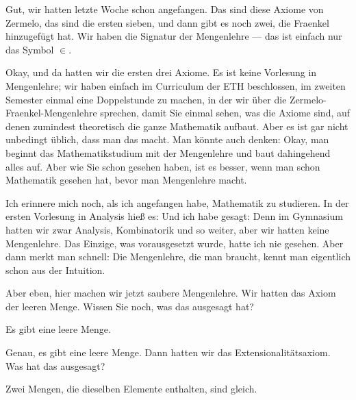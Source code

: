\begin{spoken-clean}[00:10:05 - 00:12:15]
Gut, wir hatten letzte Woche schon angefangen. Das sind diese Axiome von Zermelo, das sind die ersten sieben, und dann gibt es noch zwei, die Fraenkel hinzugefügt hat. Wir haben die Signatur der Mengenlehre --- das ist einfach nur das Symbol $\in$.

Okay, und da hatten wir die ersten drei Axiome. Es ist keine Vorlesung in Mengenlehre; wir haben einfach im Curriculum der ETH beschlossen, im zweiten Semester einmal eine Doppelstunde zu machen, in der wir über die Zermelo-Fraenkel-Mengenlehre sprechen, damit Sie einmal sehen, was die Axiome sind, auf denen zumindest theoretisch die ganze Mathematik aufbaut. Aber es ist gar nicht unbedingt üblich, dass man das macht. Man könnte auch denken: Okay, man beginnt das Mathematikstudium mit der Mengenlehre und baut dahingehend alles auf. Aber wie Sie schon gesehen haben, ist es besser, wenn man schon Mathematik gesehen hat, bevor man Mengenlehre macht.

Ich erinnere mich noch, als ich angefangen habe, Mathematik zu studieren. In der ersten Vorlesung in Analysis hieß es:  Und ich habe gesagt:  Denn im Gymnasium hatten wir zwar Analysis, Kombinatorik und so weiter, aber wir hatten keine Mengenlehre. Das Einzige, was vorausgesetzt wurde, hatte ich nie gesehen. Aber dann merkt man schnell: Die Mengenlehre, die man braucht, kennt man eigentlich schon aus der Intuition.

Aber eben, hier machen wir jetzt saubere Mengenlehre. Wir hatten das Axiom der leeren Menge. Wissen Sie noch, was das ausgesagt hat?
\end{spoken-clean}

\begin{student-interaction}[Studentenantwort]
Es gibt eine leere Menge.
\end{student-interaction}

\begin{spoken-clean}[continued]
Genau, es gibt eine leere Menge. Dann hatten wir das Extensionalitätsaxiom. Was hat das ausgesagt?
\end{spoken-clean}

\begin{student-interaction}[Studentenantwort]
Zwei Mengen, die dieselben Elemente enthalten, sind gleich.
\end{student-interaction}

